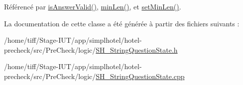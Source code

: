 Référencé par \hyperlink{classSH__StringQuestionState_a51448b87ffdb9279eaa5e7cc3ff73ce9}{is\-Answer\-Valid()}, \hyperlink{classSH__StringQuestionState_a24a95c3ce141e5e26f789720c59d2d3e}{min\-Len()}, et \hyperlink{classSH__StringQuestionState_adf29a14672e2913642f75e61bfed5818}{set\-Min\-Len()}.



La documentation de cette classe a été générée à partir des fichiers suivants \-:\begin{DoxyCompactItemize}
\item 
/home/tiff/\-Stage-\/\-I\-U\-T/app/simplhotel/hotel-\/precheck/src/\-Pre\-Check/logic/\hyperlink{SH__StringQuestionState_8h}{S\-H\-\_\-\-String\-Question\-State.\-h}\item 
/home/tiff/\-Stage-\/\-I\-U\-T/app/simplhotel/hotel-\/precheck/src/\-Pre\-Check/logic/\hyperlink{SH__StringQuestionState_8cpp}{S\-H\-\_\-\-String\-Question\-State.\-cpp}\end{DoxyCompactItemize}
